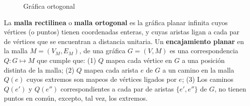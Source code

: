 \begin{figure}
  \caption{Gr\'afica ortogonal}
\end{figure}

\begin{definition}
La \textbf{malla rectilinea} o \textbf{malla ortogonal} es la gr\'afica planar infinita cuyos v\'ertices (o puntos) tienen coordenadas enteras, y cuyas aristas ligan a cada par de v\'ertices que se encuentran a distancia unitaria. Un \textbf{encajamiento planar} en la malla $M = (V_M, E_M)$, de una gr\'afica $G = (V, M)$ es una correspondencia $Q: G\mapsto M$ que cumple que: (1) $Q$ mapea cada v\'ertice en $G$ a una posici\'on distinta de la malla; (2) $Q$ mapea cada arista $e$ de $G$ a un camino en la malla $Q(e)$ cuyos extremos son mapeos de v\'ertices ligados por $e$; (3) Los caminos $Q(e')$ y $Q(e'')$ correspondientes a cada par de aristas $\{e', e''\}$ de $G$, no tienen puntos en com\'un, excepto, tal vez, los extremos.
\end{definition}

